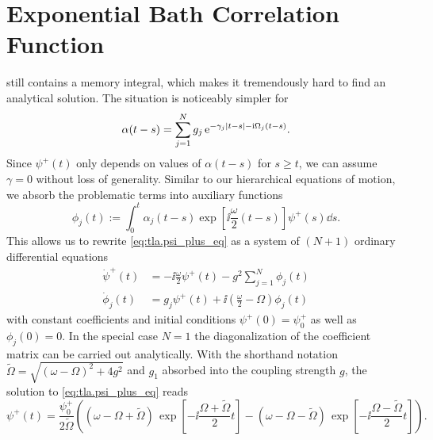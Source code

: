 \section{Exponential Bath Correlation Function}
\label{sec:tla.exp}

 still contains a memory integral, which makes it tremendously hard to find an analytical solution.
The situation is noticeably simpler for
\begin{equation}
  \alpha(t - s) = \sum_{j=1}^N g_j \, \exp[-\gamma_j \abs{t - s} - \ii \Omega_j (t - s)].
  \label{eq:tla.exp_alpha}
\end{equation}
Since $\psi^+(t)$ only depends on values of $\alpha(t-s)$ for $s \ge t$, we can assume $\gamma = 0$ without loss of generality.
Similar to our hierarchical equations of motion, we absorb the problematic terms into auxiliary functions
\begin{equation}
  \phi_j(t) := \int_0^t \alpha_j(t-s) \exp[\ii \frac{\omega}{2}(t-s)] \psi^+(s) \dd s.
  \label{eq:tla.auxiliary}
\end{equation}
This allows us to rewrite \autoref{eq:tla.psi_plus_eq} as a system of $(N+1)$ ordinary differential equations
\begin{align*}
  \dot\psi^+(t) &= -\ii \frac{\omega}{2} \psi^+(t) - g^2 \sum_{j=1}^N \phi_j(t) \\
  \dot\phi_j(t) &= g_j \psi^+(t) + \ii \left( \frac{\omega}{2} - \Omega \right) \phi_j(t)
\end{align*}
with constant coefficients and initial conditions $\psi^+(0) = \psi^+_0$ as well as $\phi_j(0) = 0$.
In the special case $N = 1$ the diagonalization of the coefficient matrix can be carried out analytically.
With the shorthand notation $\tilde\Omega = \sqrt{(\omega - \Omega)^2 + 4g^2}$ and $g_1$ absorbed into the coupling strength $g$, the solution to \autoref{eq:tla.psi_plus_eq} reads
\begin{equation}
  \psi^+(t) = \frac{\psi^+_0}{2\tilde\Omega} \left( (\omega - \Omega + \tilde\Omega) \, \exp[-\ii \frac{\Omega + \tilde\Omega}{2} t ]  -  (\omega - \Omega - \tilde\Omega) \, \exp[-\ii \frac{\Omega - \tilde\Omega}{2} t ] \right).
  \label{eq:tla.solution}
\end{equation}






